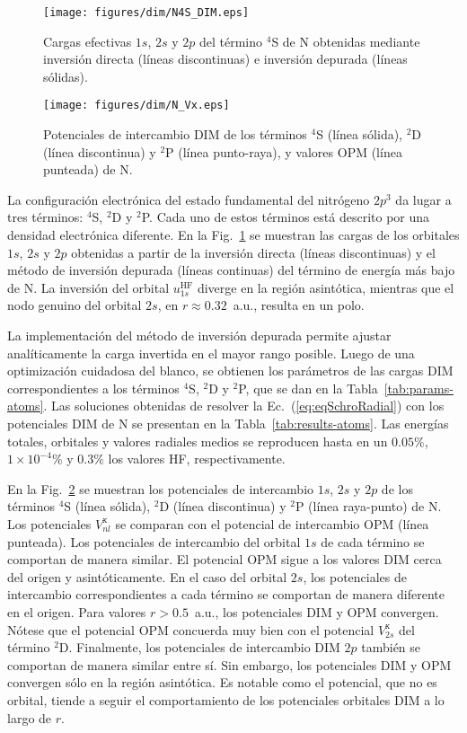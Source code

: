 \begin{figure}[t]
\centering
\texttt{[image: figures/dim/N4S\_DIM.eps]}
\caption[Cargas efectivas DIM de N.]
{Cargas efectivas $1s$, $2s$ y $2p$ del término $^4$S de N obtenidas 
mediante inversión directa (líneas discontinuas) e inversión depurada 
(líneas sólidas).}
\label{fig:Nzeff}
\end{figure}

\begin{figure}[t]
\centering
\texttt{[image: figures/dim/N\_Vx.eps]}
\caption[Potenciales de intercambio DIM de N.]
{Potenciales de intercambio DIM de los términos $^4$S (línea sólida), 
$^2$D (línea discontinua) y $^2$P (línea punto-raya), y valores OPM 
(línea punteada) de N.}
\label{fig:NVx}
\end{figure}

La configuración electrónica del estado fundamental del nitrógeno $2p^3$ 
da lugar a tres términos: $^4$S, $^2$D y $^2$P. Cada uno de estos 
términos está descrito por una densidad electrónica diferente. En la 
Fig.~\ref{fig:Nzeff} se muestran las cargas de los orbitales $1s$, $2s$ 
y $2p$ obtenidas a partir de la inversión directa (líneas discontinuas) 
y el método de inversión depurada (líneas continuas) del término de 
energía más bajo de N. La inversión del orbital $u_{1s}^{\mathrm{HF}}$ 
diverge en la región asintótica, mientras que el nodo genuino del 
orbital $2s$, en $r\approx 0.32$~a.u., resulta en un polo. 

La implementación del método de inversión depurada permite ajustar 
analíticamente la carga invertida en el mayor rango posible. Luego de 
una optimización cuidadosa del blanco, se obtienen los parámetros de las 
cargas DIM correspondientes a los términos $^4$S, $^2$D y $^2$P, que se 
dan en la Tabla~\ref{tab:params-atoms}. Las soluciones obtenidas de 
resolver la Ec.~(\ref{eq:eqSchroRadial}) con los potenciales DIM de N 
se presentan en la Tabla~\ref{tab:results-atoms}. Las energías totales, 
orbitales y valores radiales medios se reproducen hasta en un $0.05\%$, 
$1\times 10^{-4}\%$ y $0.3\%$ los valores HF, respectivamente. 

En la Fig.~\ref{fig:NVx} se muestran los potenciales de intercambio 
$1s$, $2s$ y $2p$ de los términos $^4$S (línea sólida), $^2$D (línea 
discontinua) y $^2$P (línea raya-punto) de N. Los potenciales 
$V_{nl}^{\mathrm{x}}$ se comparan con el potencial de intercambio OPM 
(línea punteada). Los potenciales de intercambio del orbital $1s$ de 
cada término se comportan de manera similar. El potencial OPM sigue a 
los valores DIM cerca del origen y asintóticamente. En el caso del 
orbital $2s$, los potenciales de intercambio correspondientes a cada 
término se comportan de manera diferente en el origen. Para valores 
$r>0.5$~a.u., los potenciales DIM y OPM convergen. Nótese que el 
potencial OPM concuerda muy bien con el potencial $V_{2s}^{\mathrm{x}}$ 
del término $^2$D. Finalmente, los potenciales de intercambio DIM $2p$ 
también se comportan de manera similar entre sí. Sin embargo, los 
potenciales DIM y OPM convergen sólo en la región asintótica. Es notable 
como el potencial, que no es orbital, tiende a seguir el comportamiento 
de los potenciales orbitales DIM a lo largo de $r$. 

